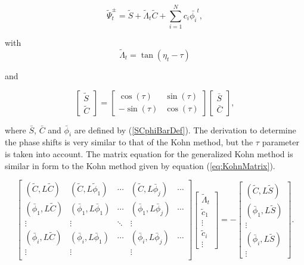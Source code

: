 \documentclass[Dissertation.tex]{subfiles}
\begin{document}
\begin{equation}
\tilde{\Psi}_t^\pm = \tilde{S} + \tilde{\Lambda}_t \tilde{C} + \sum_{i=1}^N c_i \bar{\phi_i}^t ,
\label{eq:TrialSimpleGeneral}
\end{equation}

\noindent with
\begin{equation}
\label{eq:GenKohnDef}
\tilde{\Lambda}_t = \tan(\eta_t-\tau)
\end{equation}

\noindent and

\begin{equation}
\begin{bmatrix}
\tilde{S} \\
\tilde{C}
\end{bmatrix}
=
\begin{bmatrix}
\cos(\tau) & \sin(\tau) \\
-\sin(\tau) & \cos(\tau)
\end{bmatrix}
\begin{bmatrix}
\bar{S} \\
\bar{C}
\end{bmatrix},
\end{equation}


\noindent where $\bar{S}$, $\bar{C}$ and $\bar{\phi}_i$ are defined by (\ref{SCphiBarDef}).  The derivation to determine the phase shifts is very similar to that of the Kohn method, but the $\tau$ parameter is taken into account.  The matrix equation for the generalized Kohn method is similar in form to the Kohn method given by equation (\ref{eq:KohnMatrix}).

\begin{equation}
\label{eq:GenKohnMatrix}
\begin{bmatrix} 
 (\tilde{C},L\tilde{C}) & (\tilde{C},L\tilde{\phi}_1) & \cdots & (\tilde{C},L\bar{\phi}_j) & \cdots\\
 (\bar{\phi}_1,L\tilde{C}) & (\bar{\phi}_1,L\bar{\phi}_1) & \cdots & (\bar{\phi}_1,L\bar{\phi}_j) & \cdots\\
 \vdots & \vdots & \ddots & \vdots \\
 (\bar{\phi}_i,L\tilde{C}) & (\bar{\phi}_i,L\bar{\phi}_1) & \cdots & (\bar{\phi}_i,L\bar{\phi}_j) & \cdots\\
 \vdots & \vdots & & \vdots & \\
\end{bmatrix}
\begin{bmatrix}
\tilde{\Lambda}_t\\
\tilde{c}_1\\
\vdots\\
\tilde{c}_i\\
\vdots
\end{bmatrix}
= -
\begin{bmatrix}
(\tilde{C},L\tilde{S}) \\
(\bar{\phi}_1,L\tilde{S}) \\
\vdots \\
(\bar{\phi}_i,L\tilde{S}) \\
\vdots
\end{bmatrix}.
\end{equation}
\end{document}
